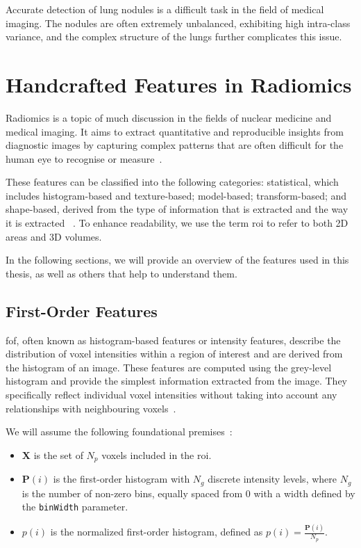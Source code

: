 Accurate detection of lung nodules is a difficult task in the field of medical imaging. The nodules are often extremely unbalanced, exhibiting high intra-class variance, and the complex structure of the lungs further complicates this issue.


\section{Handcrafted Features in Radiomics}\label{sec_features}

Radiomics is a topic of much discussion in the fields of nuclear medicine and medical imaging. It aims to extract quantitative and reproducible insights from diagnostic images by capturing complex patterns that are often difficult for the human eye to recognise or measure~\cite{cantatore_introduction_2011}.

These features can be classified into the following categories: statistical, which includes histogram-based and texture-based; model-based; transform-based; and shape-based, derived from the type of information that is extracted and the way it is extracted
~\cite{cantatore_introduction_2011, abbasian_ardakani_interpretation_2022}.
To enhance readability, we use the term \ac{roi} to refer to both 2D areas and 3D volumes.

In the following sections, we will provide an overview of the features used in this thesis, as well as others that help to understand them.

\subsection{First-Order Features}

\acf{fof}, often known as histogram-based features or intensity features, describe the distribution of voxel intensities within a region of interest and are derived from the histogram of an image. These features are computed using the grey-level histogram and provide the simplest information extracted from the image. They specifically reflect individual voxel intensities without taking into account any relationships with neighbouring voxels~\cite{abbasian_ardakani_interpretation_2022}.

We will assume the following foundational premises~\cite{van_griethuysen_computational_2017}:
\begin{itemize}
  \item $\mathbf{X}$ is the set of $N_p$ voxels included in the \ac{roi}.
  \item $\mathbf{P}(i)$ is the first-order histogram with $N_g$ discrete intensity levels, where $N_g$ is the number of non-zero bins, equally spaced from 0 with a width defined by the \texttt{binWidth} parameter.
  \item $p(i)$ is the normalized first-order histogram, defined as $p(i) = \frac{\mathbf{P}(i)}{N_p}$.
\end{itemize}

